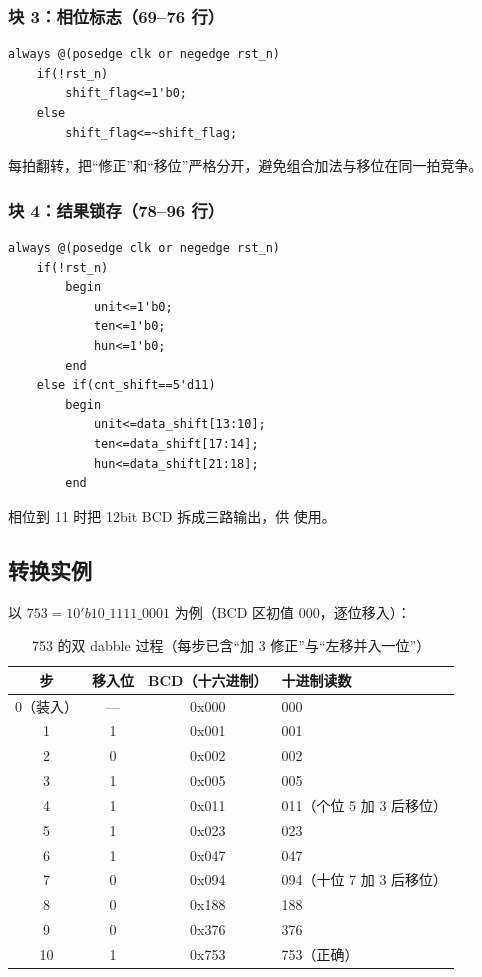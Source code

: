 \subsubsection{块 3：相位标志（69--76 行）}

\begin{lstlisting}[style=vsnip]
always @(posedge clk or negedge rst_n)
    if(!rst_n)
        shift_flag<=1'b0;
    else
        shift_flag<=~shift_flag;
\end{lstlisting}

每拍翻转，把“修正”和“移位”严格分开，避免组合加法与移位在同一拍竞争。

\subsubsection{块 4：结果锁存（78--96 行）}

\begin{lstlisting}[style=vsnip]
always @(posedge clk or negedge rst_n)
    if(!rst_n)
        begin
            unit<=1'b0;
            ten<=1'b0;
            hun<=1'b0;
        end
    else if(cnt_shift==5'd11)
        begin
            unit<=data_shift[13:10];
            ten<=data_shift[17:14];
            hun<=data_shift[21:18];
        end
\end{lstlisting}

相位到 11 时把 12bit BCD 拆成三路输出，供  使用。

\subsection{转换实例}

以 $753=10'b10\_1111\_0001$ 为例（BCD 区初值 000，逐位移入）：

\begin{table}[htbp]
\centering
\small
\caption{753 的双 dabble 过程（每步已含“加 3 修正”与“左移并入一位”）}
\begin{tabular}{cccl}
\toprule
步 & 移入位 & BCD（十六进制） & 十进制读数\\
\midrule
0（装入） & — & 0x000 & 000\\
1 & 1 & 0x001 & 001\\
2 & 0 & 0x002 & 002\\
3 & 1 & 0x005 & 005\\
4 & 1 & 0x011 & 011（个位 5 加 3 后移位）\\
5 & 1 & 0x023 & 023\\
6 & 1 & 0x047 & 047\\
7 & 0 & 0x094 & 094（十位 7 加 3 后移位）\\
8 & 0 & 0x188 & 188\\
9 & 0 & 0x376 & 376\\
10 & 1 & 0x753 & 753（正确）\\
\bottomrule
\end{tabular}
\end{table}

